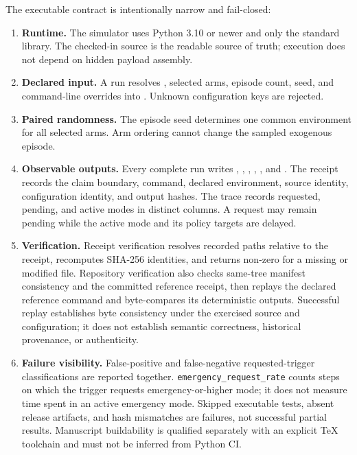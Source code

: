 \documentclass[11pt,a4paper]{article}
\numberwithin{equation}{section}
\theoremstyle{definition}
\theoremstyle{plain}
\theoremstyle{remark}
\begin{document}
The executable contract is intentionally narrow and fail-closed:
\begin{enumerate}
  \item \textbf{Runtime.} The simulator uses Python 3.10 or newer and only the standard library. The checked-in source is the readable source of truth; execution does not depend on hidden payload assembly.
  \item \textbf{Declared input.} A run resolves , selected arms, episode count, seed, and command-line overrides into . Unknown configuration keys are rejected.
  \item \textbf{Paired randomness.} The episode seed determines one common environment for all selected arms. Arm ordering cannot change the sampled exogenous episode.
  \item \textbf{Observable outputs.} Every complete run writes , , , , , and . The receipt records the claim boundary, command, declared environment, source identity, configuration identity, and output hashes. The trace records requested, pending, and active modes in distinct columns. A request may remain pending while the active mode and its policy targets are delayed.
  \item \textbf{Verification.} Receipt verification resolves recorded paths relative to the receipt, recomputes SHA-256 identities, and returns non-zero for a missing or modified file. Repository verification also checks same-tree manifest consistency and the committed reference receipt, then replays the declared reference command and byte-compares its deterministic outputs. Successful replay establishes byte consistency under the exercised source and configuration; it does not establish semantic correctness, historical provenance, or authenticity.
  \item \textbf{Failure visibility.} False-positive and false-negative requested-trigger classifications are reported together. \texttt{emergency\_request\_rate} counts steps on which the trigger requests emergency-or-higher mode; it does not measure time spent in an active emergency mode. Skipped executable tests, absent release artifacts, and hash mismatches are failures, not successful partial results. Manuscript buildability is qualified separately with an explicit TeX toolchain and must not be inferred from Python CI.
\end{enumerate}
\end{document}
